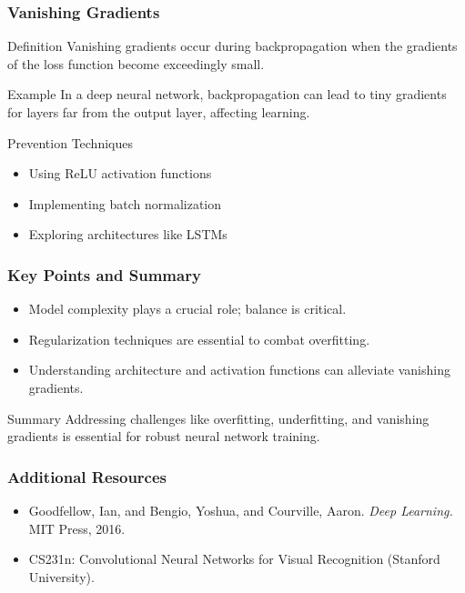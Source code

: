 \documentclass[aspectratio=169]{beamer}
\begin{document}
\begin{frame}[fragile]
    \frametitle{Vanishing Gradients}
    \begin{block}{Definition}
        Vanishing gradients occur during backpropagation when the gradients of the loss function become exceedingly small.
    \end{block}
    \begin{block}{Example}
        In a deep neural network, backpropagation can lead to tiny gradients for layers far from the output layer, affecting learning.
    \end{block}
    \begin{block}{Prevention Techniques}
        \begin{itemize}
            \item Using ReLU activation functions
            \item Implementing batch normalization
            \item Exploring architectures like LSTMs
        \end{itemize}
    \end{block}
\end{frame}

\begin{frame}[fragile]
    \frametitle{Key Points and Summary}
    \begin{itemize}
        \item Model complexity plays a crucial role; balance is critical.
        \item Regularization techniques are essential to combat overfitting.
        \item Understanding architecture and activation functions can alleviate vanishing gradients.
    \end{itemize}
    \begin{block}{Summary}
        Addressing challenges like overfitting, underfitting, and vanishing gradients is essential for robust neural network training.
    \end{block}
\end{frame}

\begin{frame}[fragile]
    \frametitle{Additional Resources}
    \begin{itemize}
        \item Goodfellow, Ian, and Bengio, Yoshua, and Courville, Aaron. \textit{Deep Learning.} MIT Press, 2016.
        \item CS231n: Convolutional Neural Networks for Visual Recognition (Stanford University).
    \end{itemize}
\end{frame}
\end{document}
